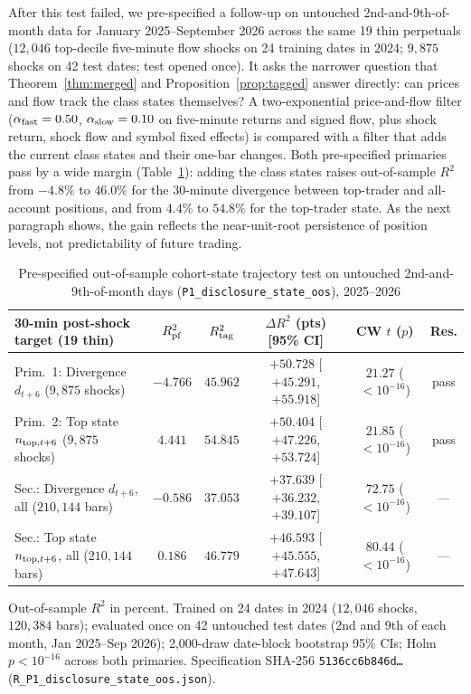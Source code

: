 After this test failed, we pre-specified a follow-up on untouched 2nd-and-9th-of-month data for January 2025--September 2026 across the same 19 thin perpetuals ($12{,}046$ top-decile five-minute flow shocks on 24 training dates in 2024; $9{,}875$ shocks on 42 test dates; test opened once). It asks the narrower question that Theorem~\ref{thm:merged} and Proposition~\ref{prop:tagged} answer directly: can prices and flow track the class states themselves? A two-exponential price-and-flow filter ($\alpha_{\rm fast}=0.50$, $\alpha_{\rm slow}=0.10$ on five-minute returns and signed flow, plus shock return, shock flow and symbol fixed effects) is compared with a filter that adds the current class states and their one-bar changes. Both pre-specified primaries pass by a wide margin (Table~\ref{tab:disc_state_oos}): adding the class states raises out-of-sample $R^2$ from $-4.8\%$ to $46.0\%$ for the 30-minute divergence between top-trader and all-account positions, and from $4.4\%$ to $54.8\%$ for the top-trader state. As the next paragraph shows, the gain reflects the near-unit-root persistence of position levels, not predictability of future trading.

\begin{table}[!htbp]\centering\footnotesize
\begin{threeparttable}
\caption{Pre-specified out-of-sample cohort-state trajectory test on untouched 2nd-and-9th-of-month days (\texttt{P1\_disclosure\_state\_oos}), 2025--2026}\label{tab:disc_state_oos}
\setlength{\tabcolsep}{1.4pt}
\begin{tabular}{lccccc}
\toprule
30-min post-shock target (19 thin) & $R^2_{\rm pf}$ & $R^2_{\rm tag}$ & $\Delta R^2$ (pts) [95\% CI] & CW $t$ ($p$) & Res.\\
\midrule
Prim.\ 1: Divergence $d_{t+6}$ ($9{,}875$ shocks) & $-4.766$ & $45.962$ & $+50.728$ [$+45.291$, $+55.918$] & $21.27$ ($<10^{-16}$) & pass\\
Prim.\ 2: Top state $n_{{\rm top},t+6}$ ($9{,}875$ shocks) & $4.441$ & $54.845$ & $+50.404$ [$+47.226$, $+53.724$] & $21.85$ ($<10^{-16}$) & pass\\
Sec.: Divergence $d_{t+6}$, all ($210{,}144$ bars) & $-0.586$ & $37.053$ & $+37.639$ [$+36.232$, $+39.107$] & $72.75$ ($<10^{-16}$) & ---\\
Sec.: Top state $n_{{\rm top},t+6}$, all ($210{,}144$ bars) & $0.186$ & $46.779$ & $+46.593$ [$+45.555$, $+47.643$] & $80.44$ ($<10^{-16}$) & ---\\
\bottomrule
\end{tabular}
\begin{tablenotes}\footnotesize\item Out-of-sample $R^2$ in percent. Trained on 24 dates in 2024 ($12{,}046$ shocks, $120{,}384$ bars); evaluated once on 42 untouched test dates (2nd and 9th of each month, Jan 2025--Sep 2026); 2{,}000-draw date-block bootstrap 95\% CIs; Holm $p<10^{-16}$ across both primaries. Specification SHA-256 \texttt{5136cc6b846d\ldots} (\texttt{R\_P1\_disclosure\_state\_oos.json}).\end{tablenotes}
\end{threeparttable}
\end{table}

